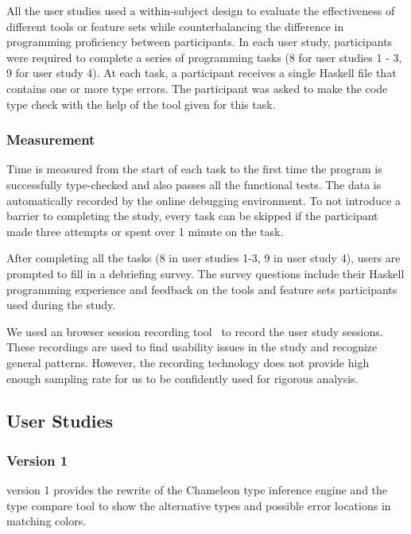 All the user studies used a within-subject design to evaluate the effectiveness of different tools or feature sets while counterbalancing the difference in programming proficiency between participants. In each user study, participants were required to complete a series of programming tasks (8 for user studies 1 - 3, 9 for user study 4). At each task, a participant receives a single Haskell file that contains one or more type errors. The participant was asked to make the code type check with the help of the tool given for this task.



\subsubsection*{\textbf{Measurement}}
Time is measured from the start of each task to the first time the program is successfully type-checked and also passes all the functional tests. The data is automatically recorded by the online debugging environment. To not introduce a barrier to completing the study, every task can be skipped if the participant made three attempts or spent over 1 minute on the task.


After completing all the tasks (8 in user studies 1-3, 9 in user study 4), users are prompted to fill in a debriefing survey. The survey questions include their Haskell programming experience and feedback on the tools and feature sets participants used during the study.


We used an browser session recording tool~\cite{openreplay} to record the user study sessions. These recordings are used to find usability issues in the study and recognize general patterns. However, the recording technology does not provide high enough sampling rate for us to be confidently used for rigorous analysis.

\subsection{\chameleon{} User Studies}


\subsubsection{\textbf{Version 1}}  
\chameleon{} version 1 provides the rewrite of the Chameleon type inference engine and the type compare tool to show the alternative types and possible error locations in matching colors.

